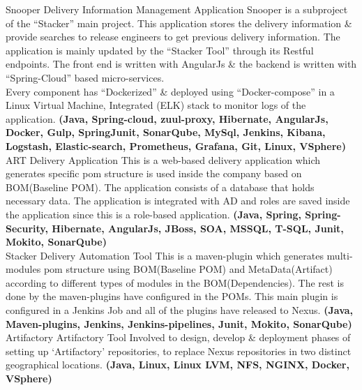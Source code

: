 \documentclass[]{cv-class}
\begin{document}
\begin{entrylist}
    \entry
        {}
	    {Snooper}
        {Delivery Information Management Application}
	    {
	        Snooper is a subproject of the “Stacker” main project. This application stores the delivery information \& provide searches to release engineers to get previous delivery information.
	        The application is mainly updated by the “Stacker Tool” through its Restful endpoints.
	        The front end is written with AngularJs \& the backend is written with “Spring-Cloud” based micro-services.
	        \\
	        Every component has “Dockerized” \& deployed using “Docker-compose” in a Linux Virtual Machine, Integrated (ELK) stack to monitor logs of the application.
	        \textbf{(Java, Spring-cloud, zuul-proxy, Hibernate, AngularJs, Docker, Gulp, SpringJunit, SonarQube, MySql, Jenkins,
	         Kibana, Logstash, Elastic-search, Prometheus, Grafana, Git, Linux, VSphere)}
	    }
	    \\
    \entry
        {}
	    {ART}
        {Delivery Application}
        {
            This is a web-based delivery application which generates specific pom structure is used inside the company based on BOM(Baseline POM).
            The application consists of a database that holds necessary data.
            The application is integrated with AD and roles are saved inside the application since this is a role-based application.
            \textbf{(Java, Spring, Spring-Security, Hibernate, AngularJs, JBoss, SOA, MSSQL, T-SQL, Junit, Mokito, SonarQube)}
        }
        \\
    \entry
        {}
    	{Stacker}
        {Delivery Automation Tool}
    	{
    	    This is a maven-plugin which generates multi-modules pom structure using BOM(Baseline POM) and MetaData(Artifact) according to different types of modules in the BOM(Dependencies).
    	    The rest is done by the maven-plugins have configured in the POMs. This main plugin is configured in a Jenkins Job and all of the plugins have released to Nexus.
    	    \textbf{(Java, Maven-plugins, Jenkins, Jenkins-pipelines, Junit, Mokito, SonarQube)}
    	}
    	\\
    \entry
        {}
    	{Artifactory}
        {Artifactory Tool}
    	{
    	    Involved to design, develop \& deployment phases of setting up ‘Artifactory’ repositories,
    	    to replace Nexus repositories in two distinct geographical locations.
    	    \textbf{(Java, Linux, Linux LVM, NFS, NGINX, Docker, VSphere)}
    	}
\end{entrylist}
\end{document}
